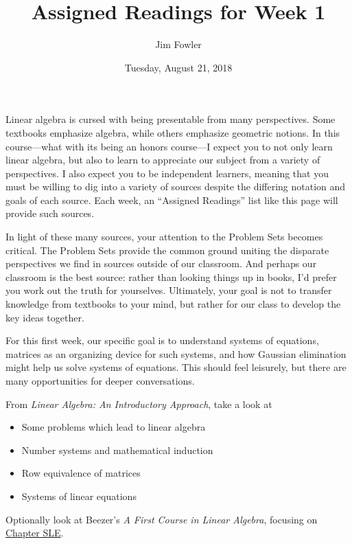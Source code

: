 \documentclass{homework}
\author{Jim Fowler}
\title{Assigned Readings for Week 1}
\date{Tuesday, August 21, 2018}
\begin{document}
\maketitle

Linear algebra is cursed with being presentable from many
perspectives.  Some textbooks emphasize algebra, while others
emphasize geometric notions.  In this course---what with its being an
honors course---I expect you to not only learn linear algebra, but
also to learn to appreciate our subject from a variety of
perspectives.  I also expect you to be independent learners, meaning
that you must be willing to dig into a variety of sources despite the
differing notation and goals of each source.  Each week, an ``Assigned
Readings'' list like this page will provide such sources.

In light of these many sources, your attention to the Problem Sets
becomes critical.  The Problem Sets provide the common ground uniting
the disparate perspectives we find in sources outside of our
classroom.  And perhaps our classroom is the best source: rather than
looking things up in books, I'd prefer you work out the truth for
yourselves.  Ultimately, your goal is not to transfer knowledge from
textbooks to your mind, but rather for our class to develop the key
ideas together.

For this first week, our specific goal is to understand systems of
equations, matrices as an organizing device for such systems, and how
Gaussian elimination might help us solve systems of equations.  This
should feel leisurely, but there are many opportunities for deeper
conversations.

From \textit{Linear Algebra: An Introductory Approach}, take a look at
\begin{itemize}
\item {} Some problems which lead to linear algebra
\item {} Number systems and mathematical induction
\item {} Row equivalence of matrices
\item {} Systems of linear equations
\end{itemize}
Optionally look at Beezer's \textit{A First Course in Linear Algebra},
focusing on
\href{https://linear.pugetsound.edu/fcla/chapter-SLE.html}{Chapter SLE}.
\end{document}
